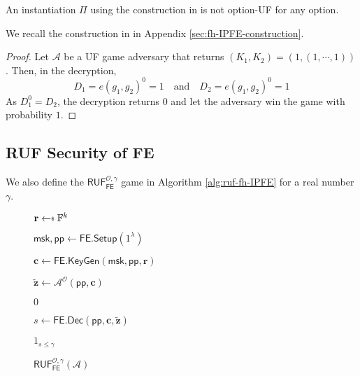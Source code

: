 \begin{theorem}

An instantiation $\Pi$ using the construction in \cite{cryptoeprint:2016/440} is not \textsf{option}-UF for any \textsf{option}.

\end{theorem}

\noindent We recall the construction in \cite{cryptoeprint:2016/440} in Appendix \ref{sec:fh-IPFE-construction}.

\begin{proof}

Let $\mathcal{A}$ be a \textsf{UF} game adversary that returns $(K_1, K_2) = (1, (1, \cdots, 1))$. Then, in the decryption,
\[
	D_1 = e(g_1, g_2)^{0} = 1 \quad \text{and} \quad D_2 = e(g_1, g_2)^0 = 1
\]
As $D_1^0 = D_2$, the decryption returns $0$ and let the adversary win the game with probability $1$.

\end{proof}


\subsection{RUF Security of \textsf{FE}}

We also define the $\textsf{RUF}^{\mathcal{O}, \gamma}_\textsf{FE}$ game in Algorithm \ref{alg:ruf-fh-IPFE} for a real number $\gamma$.

\begin{figure}[h]
\centering

	\begin{minipage}[t]{0.55\textwidth}
	\begin{algorithm}[H]
	\caption{$\textsf{RUF}^{\mathcal{O}, \gamma}_{\textsf{FE}}(\mathcal{A})$}
	\label{alg:ruf-fh-IPFE}
	\begin{algorithmic}[1]
		\State $\mathbf{r} \getsdollar \mathbb{F}^{k}$ \label{alg:oracle-ruf-fh-IPFE:r}

		\State $\textsf{msk}, \textsf{pp} \gets \textsf{FE.Setup}(1^\lambda)$

		\State $\mathbf{c} \gets \textsf{FE.KeyGen}(\textsf{msk}, \textsf{pp}, \mathbf{r})$

		\State $\mathbf{\tilde{z}} \gets \mathcal{A}^{\mathcal{O}} ( \textsf{pp}, \mathbf{c} )$

			
			\State \Return $0$
		
		\EndIf

		\State $s \gets \textsf{FE.Dec}(\textsf{pp}, \mathbf{c}, \mathbf{\tilde{z}} )$

		\State \Return $1_{s \leq \gamma}$
	\end{algorithmic}
	\end{algorithm}
	\end{minipage}

\end{figure}

